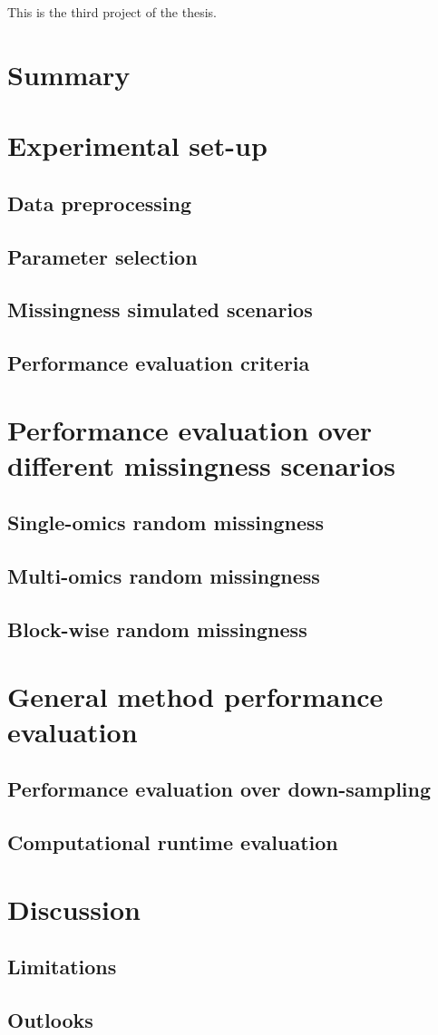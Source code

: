 This is the third project of the thesis.

\section{Summary}

\section{Experimental set-up}
    \subsection{Data preprocessing}
    \subsection{Parameter selection}
    \subsection{Missingness simulated scenarios}
    \subsection{Performance evaluation criteria}
    
\section{Performance evaluation over different missingness scenarios}
    \subsection{Single-omics random missingness}
    \subsection{Multi-omics random missingness}
    \subsection{Block-wise random missingness}

\section{General method performance evaluation}
    \subsection{Performance evaluation over down-sampling}
    \subsection{Computational runtime evaluation}
    
\section{Discussion}
    \subsection{Limitations}
    \subsection{Outlooks}